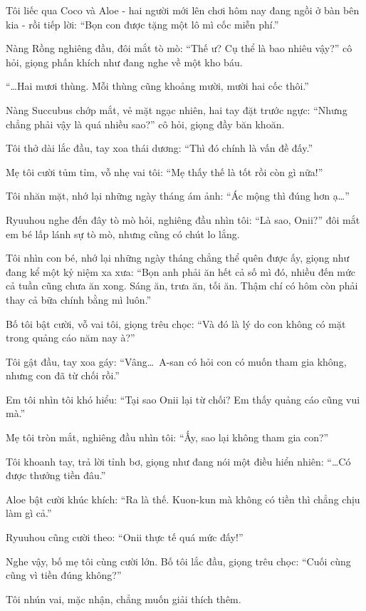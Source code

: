 \documentclass[../main.tex]{subfiles}
\begin{document}
Tôi liếc qua Coco và Aloe - hai người mới lên chơi hôm nay đang ngồi ở bàn bên kia - rồi tiếp lời: ``Bọn con được tặng một lô mì cốc miễn phí.''

Nàng Rồng nghiêng đầu, đôi mắt tò mò: ``Thế ư? Cụ thể là bao nhiêu vậy?'' cô hỏi, giọng phấn khích như đang nghe về một kho báu.

``\dots Hai mươi thùng. Mỗi thùng cũng khoảng mười, mười hai cốc thôi.''

Nàng Succubus chớp mắt, vẻ mặt ngạc nhiên, hai tay đặt trước ngực: ``Nhưng chẳng phải vậy là quá nhiều sao?'' cô hỏi, giọng đầy băn khoăn.

Tôi thở dài lắc đầu, tay xoa thái dương: ``Thì đó chính là vấn đề đấy.''

Mẹ tôi cười tủm tỉm, vỗ nhẹ vai tôi: ``Mẹ thấy thế là tốt rồi còn gì nữa!''

Tôi nhăn mặt, nhớ lại những ngày tháng ám ảnh: ``Ác mộng thì đúng hơn ạ\dots''

Ryuuhou nghe đến đây tò mò hỏi, nghiêng đầu nhìn tôi: ``Là sao, Onii?'' đôi mắt em bé lấp lánh sự tò mò, nhưng cũng có chút lo lắng.

Tôi nhìn con bé, nhớ lại những ngày tháng chẳng thể quên được ấy, giọng như đang kể một kỷ niệm xa xưa: ``Bọn anh phải ăn hết cả số mì đó, nhiều đến mức cả tuần cũng chưa ăn xong. Sáng ăn, trưa ăn, tối ăn. Thậm chí có hôm còn phải thay cả bữa chính bằng mì luôn.''

Bố tôi bật cười, vỗ vai tôi, giọng trêu chọc: ``Và đó là lý do con không có mặt trong quảng cáo năm nay à?''

Tôi gật đầu, tay xoa gáy: ``Vâng\dots\ A-san có hỏi con có muốn tham gia không, nhưng con đã từ chối rồi.''

Em tôi nhìn tôi khó hiểu: ``Tại sao Onii lại từ chối? Em thấy quảng cáo cũng vui mà.''

Mẹ tôi tròn mắt, nghiêng đầu nhìn tôi: ``Ấy, sao lại không tham gia con?''

Tôi khoanh tay, trả lời tỉnh bơ, giọng như đang nói một điều hiển nhiên: ``\dots Có được thưởng tiền đâu.''

Aloe bật cười khúc khích: ``Ra là thế. Kuon-kun mà không có tiền thì chẳng chịu làm gì cả.''

Ryuuhou cũng cười theo: ``Onii thực tế quá mức đấy!''

Nghe vậy, bố mẹ tôi cùng cười lớn. Bố tôi lắc đầu, giọng trêu chọc: ``Cuối cùng cũng vì tiền đúng không?''

Tôi nhún vai, mặc nhận, chẳng muốn giải thích thêm.
\end{document}
